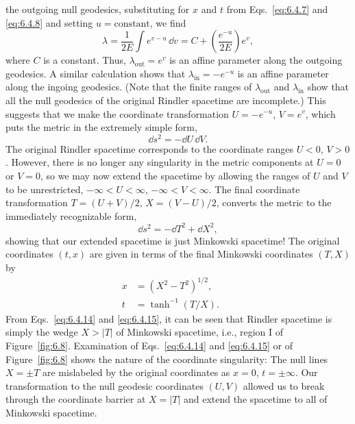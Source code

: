 the outgoing null geodesics, substituting for \(x\) and \(t\) from
Eqs.~\eqref{eq:6.4.7} and \eqref{eq:6.4.8} and setting \(u=\text{constant}\), we
find
\begin{equation}
  \lambda=\frac{1}{2E}\int e^{v-u}\,\dd v
  =C+\left(\frac{e^{-u}}{2E}\right)e^v,
  \tag{6.4.11}\label{eq:6.4.11}
\end{equation}
where \(C\) is a constant. Thus, \(\lambda_{\mathrm{out}}=e^v\) is an affine
parameter along the outgoing geodesics. A similar calculation shows that
\(\lambda_{\mathrm{in}}=-e^{-u}\) is an affine parameter along the ingoing
geodesics. (Note that the finite ranges of \(\lambda_{\mathrm{out}}\) and
\(\lambda_{\mathrm{in}}\) show that all the null geodesics of the original Rindler
spacetime are incomplete.) This suggests that we make the coordinate
transformation \(U=-e^{-u}\), \(V=e^v\), which puts the metric in the extremely
simple form,
\begin{equation}
  \dd s^2=-\dd U\,\dd V.
  \tag{6.4.12}\label{eq:6.4.12}
\end{equation}
The original Rindler spacetime corresponds to the coordinate ranges \(U<0\),
\(V>0\). However, there is no longer any singularity in the metric components at
\(U=0\) or \(V=0\), so we may now extend the spacetime by allowing the ranges of
\(U\) and \(V\) to be unrestricted, \(-\infty<U<\infty\),
\(-\infty<V<\infty\). The final coordinate transformation
\(T=(U+V)/2\), \(X=(V-U)/2\), converts the metric to the immediately
recognizable form,
\begin{equation}
  \dd s^2=-\dd T^2+\dd X^2,
  \tag{6.4.13}\label{eq:6.4.13}
\end{equation}
showing that our extended spacetime is just Minkowski spacetime! The original
coordinates \((t,x)\) are given in terms of the final Minkowski coordinates
\((T,X)\) by
\begin{align}
  x&=(X^2-T^2)^{1/2},
  &&\tag{6.4.14}\label{eq:6.4.14}\\
  t&=\tanh^{-1}(T/X).
  &&\tag{6.4.15}\label{eq:6.4.15}
\end{align}
From Eqs.~\eqref{eq:6.4.14} and \eqref{eq:6.4.15}, it can be seen that Rindler
spacetime is simply the wedge \(X>|T|\) of Minkowski spacetime, i.e., region I
of Figure~\ref{fig:6.8}. Examination of Eqs.~\eqref{eq:6.4.14} and
\eqref{eq:6.4.15} or of Figure~\ref{fig:6.8} shows the nature of the coordinate
singularity: The null lines \(X=\pm T\) are mislabeled by the original
coordinates as \(x=0\), \(t=\pm\infty\). Our transformation to the null
geodesic coordinates \((U,V)\) allowed us to break through the coordinate barrier
at \(X=|T|\) and extend the spacetime to all of Minkowski spacetime.



